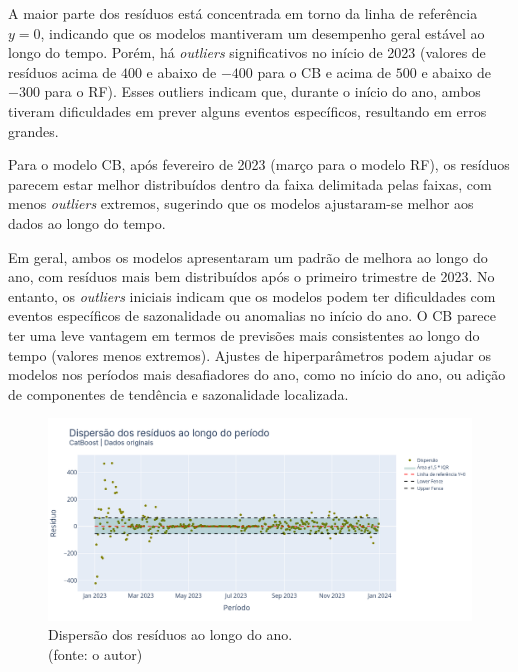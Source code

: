 A maior parte dos resíduos está concentrada em torno da linha de referência $y=0$, indicando que os modelos mantiveram um desempenho geral estável ao longo do tempo. Porém, há \textit{outliers} significativos no início de 2023 (valores de resíduos acima de $400$ e abaixo de $-400$ para o CB e acima de $500$ e abaixo de $-300$ para o RF). Esses outliers indicam que, durante o início do ano, ambos tiveram dificuldades em prever alguns eventos específicos, resultando em erros grandes.

Para o modelo CB, após fevereiro de 2023 (março para o modelo RF), os resíduos parecem estar melhor distribuídos dentro da faixa delimitada pelas faixas, com menos \textit{outliers} extremos, sugerindo que os modelos ajustaram-se melhor aos dados ao longo do tempo.

Em geral, ambos os modelos apresentaram um padrão de melhora ao longo do ano, com resíduos mais bem distribuídos após o primeiro trimestre de 2023. No entanto, os \textit{outliers} iniciais indicam que os modelos podem ter dificuldades com eventos específicos de sazonalidade ou anomalias no início do ano. O CB parece ter uma leve vantagem em termos de previsões mais consistentes ao longo do tempo (valores menos extremos). Ajustes de hiperparâmetros podem ajudar os modelos nos períodos mais desafiadores do ano, como no início do ano, ou adição de componentes de tendência e sazonalidade localizada.

\begin{figure}[!h]
\centering
\includegraphics[scale=0.33]{Figuras/jequiti/resultados/CB_WFV_ORIG_RESID_x_TEMPO.png}
\caption{Dispersão dos resíduos ao longo do ano.\\(fonte: o autor)}
\label{fig:jequiti_CB_WFV_ORIG_RESID_x_TEMPO}
\end{figure}

